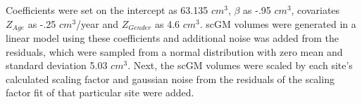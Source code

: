 Coefficients were set on the intercept as 63.135 $cm^3$, $\beta$ as -.95 $cm^3$, covariates $Z_{Age}$ as -.25 $cm^3$/year and $Z_{Gender}$ as 4.6 $cm^3$. scGM volumes were generated in a linear model using these coefficients and additional noise was added from the  residuals, which were sampled from a normal distribution with zero mean and standard deviation 5.03 $cm^3$. Next, the scGM volumes were scaled by each site's calculated scaling factor and gaussian noise from the residuals of the scaling factor fit of that particular site were added.